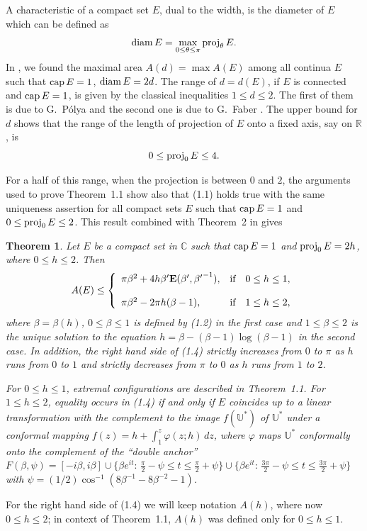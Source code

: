 \documentclass[11pt]{pjm}
\newtheorem{theorem}{Theorem}[section]
\newcommand{\be}{\begin{equation}}
\newcommand{\eeq}{\end{equation}}
\newcommand{\bt}{\begin{theorem}}
\newcommand{\et}{\end{theorem}}
\newcommand{\E}{{\bf{E}}}
\newcommand{\diam}{{\rm diam}\,}
\newcommand{\CAP}{{\rm cap}\,}
\newcommand{\proj}{{\rm proj}_0\,}
\newcommand{\projth}{{\rm proj}_\theta\,}
\newcommand{\R}{{\mathbb R}}
\newcommand{\C}{{\mathbb{C}}}
\newcommand{\U}{{\mathbb{U}}}
\begin{document}
A characteristic of a compact set $E$, dual to the width, is the diameter of $E$ which can be defined as 
$$
\diam E=\max_{0\le \theta\le \pi} \projth E.
$$
In \cite[Theorem~2]{BPS}, we found the maximal area $A(d)= \max A(E)$ among all continua $E$ such that $\CAP E=1$, $\diam E=2d$.
The range of $d=d(E)$, if $E$ is connected and $\CAP E=1$, is given by the classical inequalities $1\le d\le 2$. The first of them is due to G.~P\'{o}lya
\cite{Po} and the second one is due to G.~Faber \cite{F}. The upper bound for $d$  shows that the range of the length of projection of $E$ onto a fixed
axis, say on $\R$, is
$$
0\le \proj E\le 4.
$$

For a half of this range, when the projection is between $0$ and $2$, the arguments used to prove Theorem~1.1 show also that 
 (1.1) holds true with the same uniqueness assertion for all compact
sets $E$ such that $\CAP E=1$ and $0\le \proj E\le 2$. This result combined with Theorem~2 in \cite{BPS} gives
\bt
Let $E$ be a compact set in $\C$ such that $\CAP E=1$ and $\proj E=2h$, where $0\le h \le 2$. Then
\be
A(E)\le \left\{
\begin{array}{ll} 
 \pi \beta^2 +4h\beta' \E(\beta',{\beta'}^{-1}),
 & {\mbox{if}} \quad 0\le h \le 1,\\
{}&{}\\
\pi\beta^2-2\pi h(\beta-1) ,& {\mbox{if}} \quad 1\le h \le 2,
\end{array}
\right.
\eeq
where $\beta=\beta(h)$, $0\le \beta \le 1$ is defined by (1.2) in the first case and $1\le \beta\le 2$ is the unique solution to the equation
$h=\beta -(\beta-1)\log (\beta-1)$ in the second case. In addition,  the right hand side of (1.4) strictly increases
from $0$ to $\pi$ as $h$ runs from $0$ to $1$ and strictly decreases from $\pi$ to $0$ as $h$ runs from $1$ to $2$.



For $0\le h\le 1$, extremal configurations are described in Theorem~1.1. For $1\le h\le 2$, equality occurs in (1.4) if and only if $E$ coincides
up to a linear transformation with the complement to the image $f(\U^*)$ of $\U^*$ under a conformal mapping $f(z)=h+\int_1^z \varphi(z;h)\,dz$,
where $\varphi$ maps $\U^*$ conformally onto the complement of the ``double anchor''  
$
F(\beta,\psi)=[-i\beta,i\beta] \cup \{\beta e^{it}:\,\frac\pi2-\psi\le t \le \frac\pi2+\psi\}
 \cup \{\beta e^{it}:\,\frac{3\pi}{2}-\psi\le t \le \frac{3\pi}{2}+\psi\}
$
with $\psi=(1/2)\cos^{-1}(8\beta^{-1}-8\beta^{-2}-1)$.
\et

For the right hand side of (1.4) we will keep notation $A(h)$, where now $0\le h \le 2$; in context of Theorem~1.1, 
$A(h)$ was defined only for $0\le h \le 1$. 
\end{document}
